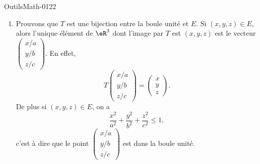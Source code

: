 
\begin{corrige}{OutilsMath-0122}

    \begin{enumerate}
        \item
            Prouvons que \( T\) est une bijection entre la boule unité et \( E\). Si \( (x,y,z)\in E\), alors l'unique élément de \( \eR^3\) dont l'image par \( T\) est \( (x,y,z)\) est le vecteur \( \begin{pmatrix}
                x/a    \\ 
                y/b    \\ 
                z/c    
            \end{pmatrix}\). En effet,
            \begin{equation}
                T\begin{pmatrix}
                    x/a    \\ 
                    y/b    \\ 
                    z/c    
                \end{pmatrix}=\begin{pmatrix}
                    x    \\ 
                    y    \\ 
                    z    
                \end{pmatrix}.
            \end{equation}
            De plus si \( (x,y,z)\in E\), on a 
            \begin{equation}
                \frac{ x^2 }{ a^2 }+\frac{ y^2 }{ b^2 }+\frac{ z^2 }{ c^2 }\leq 1,
            \end{equation}
            c'est à dire que le point \( \begin{pmatrix}
                x/a    \\ 
                y/b    \\ 
                z/c    
            \end{pmatrix}\) est dans la boule unité.


\end{enumerate}
\end{corrige}
